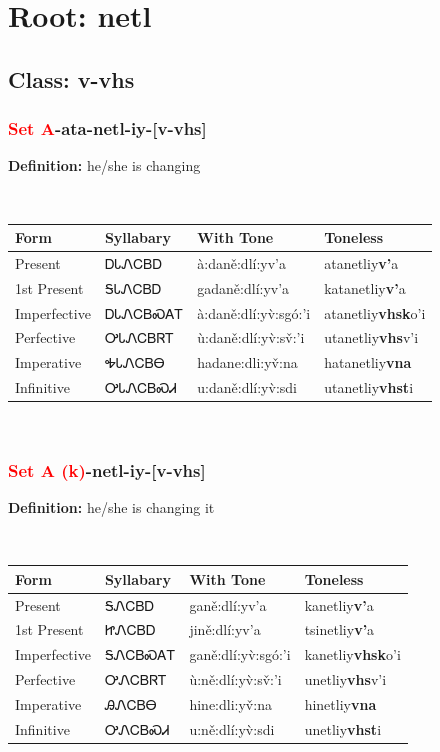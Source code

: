 \needspace{4in}
\section*{Root: netl}
\nopagebreak
{}
\needspace{3in}
\subsection*{Class: v-vhs}
\nopagebreak
\needspace{2in}
\subsubsection*{\textcolor{Red}{Set A}{-}ata{-}\textbf{netl}{-}iy{-}[v-vhs]}
\nopagebreak
\textbf{Definition: } he/she is changing
\\[0.5em]
\begin{tabularx}{\textwidth}{l X X X}%
\toprule%
\textbf{Form}&\textbf{Syllabary}&\textbf{With Tone}&\textbf{Toneless}\\%
\midrule%
Present&ᎠᏓᏁᏟᏴᎠ&à:daně:dlí:yv’a&atanetliy\textbf{v'}a\\%
1st Present&ᎦᏓᏁᏟᏴᎠ&gadaně:dlí:yv’a&katanetliy\textbf{v'}a\\%
Imperfective&ᎠᏓᏁᏟᏴᏍᎪᎢ&à:daně:dlí:yv̀:sgó:’i&atanetliy\textbf{vhsk}o'i\\%
Perfective&ᎤᏓᏁᏟᏴᏒᎢ&ù:daně:dlí:yv̀:sv̌:’i&utanetliy\textbf{vhs}v'i\\%
Imperative&ᎭᏓᏁᏟᏴᎾ&hadane:dli:yv̌:na&hatanetliy\textbf{vna}\\%
Infinitive&ᎤᏓᏁᏟᏴᏍᏗ&u:daně:dlí:yv̀:sdi&utanetliy\textbf{vhst}i\\%
\bottomrule%
\end{tabularx}
\\[1em]
\needspace{2in}
\subsubsection*{\textcolor{Red}{Set A (k)}{-}\textbf{netl}{-}iy{-}[v-vhs]}
\nopagebreak
\textbf{Definition: } he/she is changing it
\\[0.5em]
\begin{tabularx}{\textwidth}{l X X X}%
\toprule%
\textbf{Form}&\textbf{Syllabary}&\textbf{With Tone}&\textbf{Toneless}\\%
\midrule%
Present&ᎦᏁᏟᏴᎠ&ganě:dlí:yv’a&kanetliy\textbf{v'}a\\%
1st Present&ᏥᏁᏟᏴᎠ&jině:dlí:yv’a&tsinetliy\textbf{v'}a\\%
Imperfective&ᎦᏁᏟᏴᏍᎪᎢ&ganě:dlí:yv̀:sgó:’i&kanetliy\textbf{vhsk}o'i\\%
Perfective&ᎤᏁᏟᏴᏒᎢ&ù:ně:dlí:yv̀:sv̌:’i&unetliy\textbf{vhs}v'i\\%
Imperative&ᎯᏁᏟᏴᎾ&hine:dli:yv̌:na&hinetliy\textbf{vna}\\%
Infinitive&ᎤᏁᏟᏴᏍᏗ&u:ně:dlí:yv̀:sdi&unetliy\textbf{vhst}i\\%
\bottomrule%
\end{tabularx}
\\[1em]
